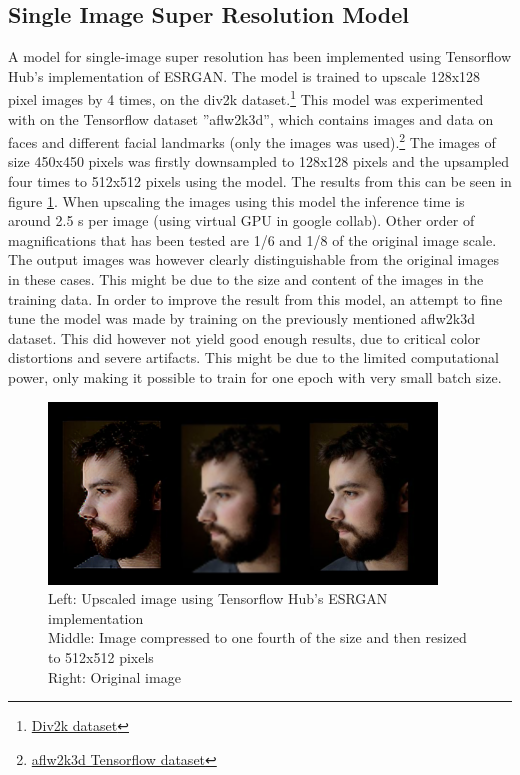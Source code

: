 \documentclass[10pt,twocolumn,letterpaper]{article}
\begin{document}
\subsection{Single Image Super Resolution Model}
A model for single-image super resolution has been implemented using Tensorflow Hub's implementation of ESRGAN. The model is trained to upscale 128x128 pixel images by 4 times, on the div2k dataset.\footnote{\href{https://data.vision.ee.ethz.ch/cvl/DIV2K/}{Div2k dataset}} This model was experimented with on the Tensorflow dataset ''aflw2k3d'', which contains images and data on faces and different facial landmarks (only the images was used).\footnote{\href{https://www.tensorflow.org/datasets/catalog/aflw2k3d}{aflw2k3d Tensorflow dataset}} The images of size 450x450 pixels was firstly downsampled to 128x128 pixels and the upsampled four times to 512x512 pixels using the model. The results from this can be seen in figure \ref{ESRGAN_comp}. When upscaling the images using this model the inference time is around 2.5 s per image (using virtual GPU in google collab). Other order of magnifications that has been tested are 1/6 and 1/8 of the original image scale. The output images was however clearly distinguishable from the original images in these cases. This might be due to the size and content of the images in the training data. In order to improve the result from this model, an attempt to fine tune the model was made by training on the previously mentioned aflw2k3d dataset. This did however not yield good enough results, due to critical color distortions and severe artifacts. This might be due to the limited computational power, only making it possible to train for one epoch with very small batch size. 
\begin{figure}[t]
  \centering
   \includegraphics[scale=0.8]{figure/ESRGAN_comparison.png}

   \caption{Left: Upscaled image using Tensorflow Hub's ESRGAN implementation\\
    Middle: Image compressed to one fourth of the size and then resized to 512x512 pixels\\
    Right: Original image}
   \label{ESRGAN_comp}
\end{figure}
\end{document}
